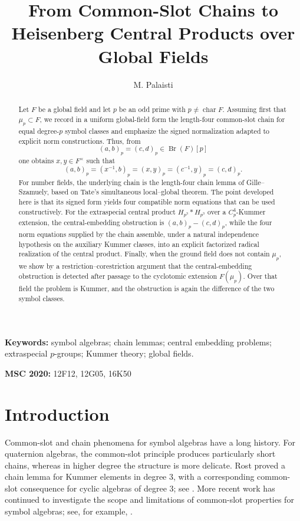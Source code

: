\documentclass[12pt]{amsart}
\title[Common-slot chains and Heisenberg central products]{From Common-Slot Chains to Heisenberg Central Products over Global Fields}
\author[M. Palaisti]{M. Palaisti}
\date{}
\theoremstyle{definition}
\theoremstyle{remark}
\DeclareMathOperator{\Br}{Br}
\begin{document}
\begin{abstract}
Let $F$ be a global field and let $p$ be an odd prime with $p\neq\operatorname{char}F$. Assuming first that $\mu_p\subset F$, we record in a uniform global-field form the length-four common-slot chain for equal degree-$p$ symbol classes and emphasize the signed normalization adapted to explicit norm constructions. Thus, from
\[(a,b)_p=(c,d)_p\in\Br(F)[p]\]
one obtains $x,y\in F^\times$ such that
\[(a,b)_p=(x^{-1},b)_p=(x,y)_p=(c^{-1},y)_p=(c,d)_p.\]
For number fields, the underlying chain is the length-four chain lemma of Gille--Szamuely, based on Tate's simultaneous local--global theorem. The point developed here is that its signed form yields four compatible norm equations that can be used constructively. For the extraspecial central product $H_{p^3}*H_{p^3}$ over a $C_p^4$-Kummer extension, the central-embedding obstruction is $(a,b)_p-(c,d)_p$, while the four norm equations supplied by the chain assemble, under a natural independence hypothesis on the auxiliary Kummer classes, into an explicit factorized radical realization of the central product. Finally, when the ground field does not contain $\mu_p$, we show by a restriction--corestriction argument that the central-embedding obstruction is detected after passage to the cyclotomic extension $F(\mu_p)$. Over that field the problem is Kummer, and the obstruction is again the difference of the two symbol classes.
\end{abstract}



\maketitle

\noindent \textbf{Keywords:} symbol algebras; chain lemmas; central embedding problems; extraspecial $p$-groups; Kummer theory; global fields.

\noindent \textbf{MSC 2020:} 12F12, 12G05, 16K50

\section{Introduction}

Common-slot and chain phenomena for symbol algebras have a long history. For
quaternion algebras, the common-slot principle produces particularly short
chains, whereas in higher degree the structure is more delicate. Rost proved
a chain lemma for Kummer elements in degree $3$, with a corresponding
common-slot consequence for cyclic algebras of degree $3$; see \cite{Rost}.
More recent work has continued to investigate the scope and limitations of
common-slot properties for symbol algebras; see, for example,
\cite{Sivatski}.
\end{document}

